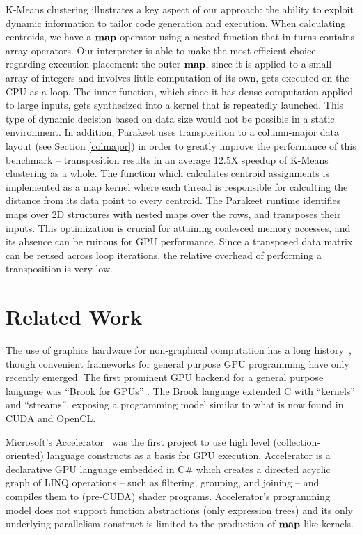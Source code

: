 \documentclass[preprint]{sigplanconf}
\begin{document}
K-Means clustering illustrates a key aspect of our approach: the ability to exploit dynamic information to tailor code generation and execution.  When calculating centroids, we have a $\mbox{\textbf{map}}$ operator using a nested function that in turns contains array operators.  Our interpreter is able to make the most efficient choice regarding execution placement: the outer $\mbox{\textbf{map}}$, since it is applied to a small array of integers and involves little computation of its own, gets executed on the CPU as a loop.  The inner function, which since it has dense computation applied to large inputs, gets synthesized into a kernel that is repeatedly launched.  This type of dynamic decision based on data size would not be possible in a static environment.  In addition, Parakeet uses transposition to a column-major data layout (see Section \ref{colmajor}) in order to greatly improve the performance of this benchmark -- transposition results in an average 12.5X speedup of K-Means clustering as a whole. The function which calculates centroid assignments is implemented as a map kernel where each thread is responsible for calculting the distance from its data point to every centroid. The Parakeet runtime identifies maps over 2D structures with nested maps over the rows, and transposes their inputs. This optimization is crucial for attaining coalesced memory accesses, and its absence can be ruinous for GPU performance.  Since a transposed data matrix can be reused across loop iterations, the relative overhead of performing a transposition is very low.

\section{Related Work}
\label{RelatedWork}
The use of graphics hardware for non-graphical computation has a  long history~\cite{Leng90}, though convenient frameworks for general purpose GPU programming have only recently emerged. The first prominent GPU backend for a general purpose language was ``Brook for GPUs'' \cite{Buck04}. The Brook language extended C with ``kernels'' and ``streams'', exposing a programming model similar to what is now found in CUDA and OpenCL.

Microsoft's Accelerator~\cite{Tard06} was the first project to use high level (collection-oriented) language constructs as a basis for GPU execution. Accelerator is a declarative GPU language embedded in C\# which creates a directed acyclic graph of LINQ operations -- such as filtering, grouping, and joining -- and compiles them to (pre-CUDA) shader programs. Accelerator's programming model does not support function abstractions (only expression trees) and its only underlying parallelism construct is limited to the production of $\mbox{\textbf{map}}$-like kernels.
\end{document}
